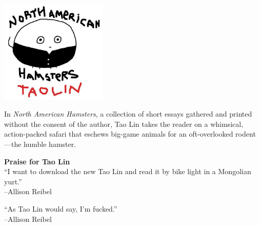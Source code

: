 \documentclass[10pt,twoside,openright]{memoir}
\begin{document}


\begin{vplace}
\begin{center}
  \includegraphics[width=2in]{img/cover}
\end{center}
\end{vplace}

\pagebreak
\mbox{}


\pagebreak
\mbox{}


\pagebreak

\begin{vplace}
\noindent
In {\em North American Hamsters}, a collection of short essays gathered and 
printed without the consent of the author, Tao Lin takes the reader on a
whimsical, action-packed safari that eschews big-game animals for an
oft-overlooked rodent---the humble hamster.

\begin{center}
\textbf{Praise for Tao Lin}
\\[1em]

``I want to download the new Tao Lin and read it by bike light in a Mongolian
yurt.''\\
--Allison Reibel

\vspace{1em}

``As Tao Lin would say, I'm fucked.'' \\
--Allison Reibel
\end{center}
\end{vplace}
\end{document}
